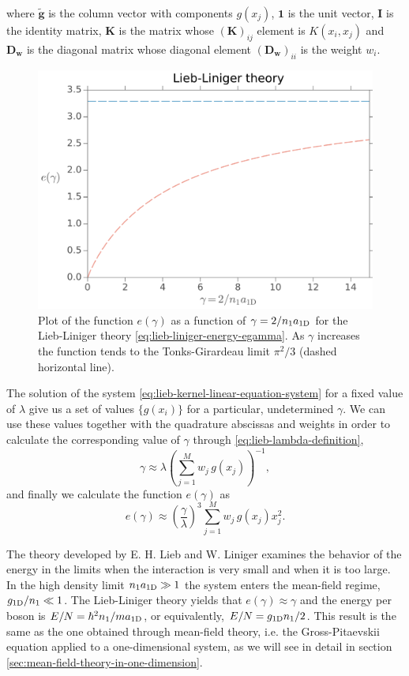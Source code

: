 %
where $\mathbf{\tilde g}$ is the column vector with components $g(x_j)$,
$\mathbf{1}$ is the unit vector, $\mathbf{I}$ is the identity matrix,
$\mathbf{K}$ is the matrix whose $(\mathbf{K})_{ij}$ element is $K(x_i, x_j)$
and $\mathbf{D_w}$ is the diagonal matrix whose diagonal element
$(\mathbf{D_w})_{ii}$ is the weight $w_i$.
%
\begin{figure}[t!]
  \centering
  \includegraphics[width=0.85\linewidth]{./figures/lieb-liniger-theory_energy-as-gamma}
  \caption{ Plot of the function $e(\gamma)$ as a function of $\gamma = 2 /
      {{n}_1} a_{ \mathrm{1D} }$ for the Lieb-Liniger theory
    \eqref{eq:lieb-liniger-energy-egamma}. As $\gamma$ increases the function
    tends to the Tonks-Girardeau limit $\pi^2/3$ (dashed horizontal line). }
  \label{fig:lieb-liniger-theory-energy-as-gamma}
\end{figure}
%
The solution of the system \eqref{eq:lieb-kernel-linear-equation-system} for a
fixed value of $\lambda$ give us a set of values $\{ g(x_i) \}$ for a
particular, undetermined $\gamma$. We can use these values together with the
quadrature abscissas and weights in order to calculate the corresponding value
of $\gamma$ through \eqref{eq:lieb-lambda-definition},
%
\begin{equation}
  \gamma \approx \lambda \left( \sum_{j=1}^{M} w_j \, g(x_j) \right)^{-1},
\end{equation}
%
and finally we calculate the function $e(\gamma)$ as
%
\begin{equation}
  e(\gamma) \approx \left(\frac{\gamma}{\lambda}\right)^3 \sum_{j=1}^{M} w_j \, g(x_j) x_j^2.
\end{equation}

The theory developed by E. H. Lieb and W. Liniger
\cite{bib:lieb-phys-rev.130.1605.1963} examines the behavior of the energy in
the limits when the interaction is very small and when it is too large. In the
high density limit ${{n}_1} a_{ \mathrm{1D} } \gg 1$ the system enters  the
mean-field regime, $g_{ \mathrm{1D} } / {{n}_1} \ll 1$. The Lieb-Liniger theory
yields that $e(\gamma) \approx \gamma$ and the energy per boson is $E/N =
  \hbar^2 {{n}_1} / m a_{ \mathrm{1D} }$, or equivalently, $E/N = g_{ \mathrm{1D} } {{n}_1}
  / 2$. This result is the same as the one obtained through mean-field theory,
i.e. the Gross-Pitaevskii equation applied to a one-dimensional system, as we
will see in detail in section \ref{sec:mean-field-theory-in-one-dimension}.

